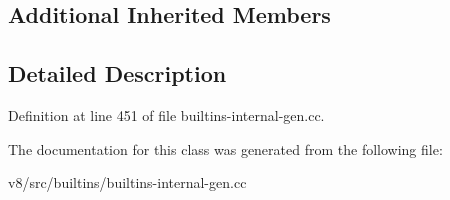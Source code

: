 \subsection*{Additional Inherited Members}


\subsection{Detailed Description}


Definition at line 451 of file builtins-\/internal-\/gen.\+cc.



The documentation for this class was generated from the following file\+:\begin{DoxyCompactItemize}
\item 
v8/src/builtins/builtins-\/internal-\/gen.\+cc\end{DoxyCompactItemize}
